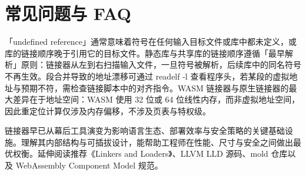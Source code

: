 \chapter{常见问题与 FAQ}
「undefined reference」通常意味着符号在任何输入目标文件或库中都未定义，或库的链接顺序晚于引用它的目标文件。静态库与共享库的链接顺序遵循「最早解析」原则：链接器从左到右扫描输入文件，一旦符号被解析，后续库中的同名符号不再生效。段合并导致的地址漂移可通过 readelf -l 查看程序头，若某段的虚拟地址与预期不符，需检查链接脚本中的对齐指令。WASM 链接器与原生链接器的最大差异在于地址空间：WASM 使用 32 位或 64 位线性内存，而非虚拟地址空间，因此重定位计算仅涉及内存偏移，不涉及页表与特权级。\par
链接器早已从幕后工具演变为影响语言生态、部署效率与安全策略的关键基础设施。理解其内部结构与可插拔设计，能帮助工程师在性能、尺寸与安全之间做出最优权衡。延伸阅读推荐《Linkers and Loaders》、LLVM LLD 源码、mold 仓库以及 WebAssembly Component Model 规范。\par
